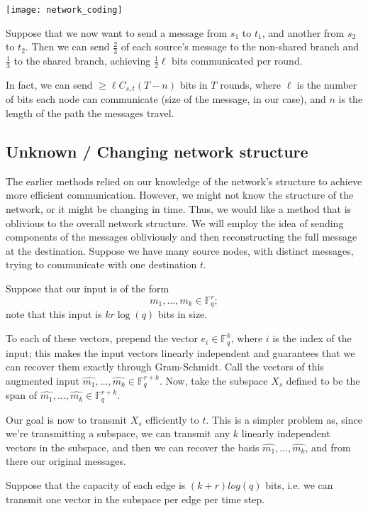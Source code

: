 \documentclass[11pt]{article}
\newcommand{\F}{\mathbb{F}}
\begin{document}
\begin{center}
\texttt{[image: network\_coding]}
\end{center}

Suppose that we now want to send a message from $s_1$ to $t_1$, and another from $s_2$ to $t_2$. Then
we can send $\frac{2}{3}$ of each source's message to the non-shared branch and $\frac{1}{3}$ to the 
shared branch, achieving $\frac{1}{2}\ell$ bits communicated per round.

In fact, we can send $\geq \ell C_{s,t} (T - n)$ bits in $T$ rounds, where $\ell$ is the number of bits
each node can communicate (size of the message, in our case), and $n$ is the length of the path the 
messages travel.

\subsection{Unknown / Changing network structure}

The earlier methods relied on our knowledge of the network's structure to achieve more efficient 
communication. However, we might not know the structure of the network, or it might be changing in time.
Thus, we would like a method that is oblivious to the overall network structure. We will employ the idea
of sending components of the messages obliviously and then reconstructing the full message at the destination.
Suppose we have many source nodes, with distinct messages, trying to communicate with one destination $t$.

Suppose that our input is of the form
$$
m_1, \ldots, m_k \in \F_q^r;
$$
note that this input is $kr\log(q)$ bits in size.

To each of these vectors, prepend the vector $e_i \in \F_q^k$, where $i$ is the index of the input;
this makes the input vectors linearly independent and guarantees that we can recover them exactly through
Gram-Schmidt. Call the vectors of this augmented input $\hat{m_1}, \ldots, \hat{m_k} \in \F_q^{r+k}$.
Now, take the subspace $X_s$ defined to be the span of $\hat{m_1}, \ldots, \hat{m_k} \in \F_q^{r+k}$.

Our goal is now to transmit $X_s$ efficiently to $t$. This is a simpler problem as, since we're transmitting a subspace,
we can transmit any $k$ linearly independent vectors in the subspace, and then we can recover the basis
$\hat{m_1}, \ldots, \hat{m_k}$, and from there our original messages. 

Suppose that the capacity of each edge is $(k+r)log(q)$ bits, i.e. we can transmit one vector in the 
subspace per edge per time step.
\end{document}
